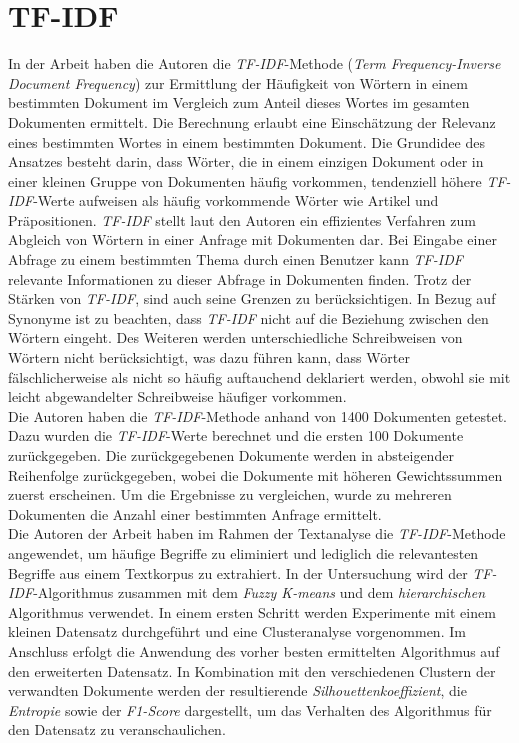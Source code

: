 \section{TF-IDF}
In der Arbeit \cite{ramos2003using} haben die Autoren \citeauthor{ramos2003using} die \emph{TF-IDF}-Methode (\emph{Term Frequency-Inverse Document Frequency}) zur Ermittlung der Häufigkeit von Wörtern in einem bestimmten Dokument im Vergleich zum Anteil dieses Wortes im gesamten Dokumenten ermittelt. Die Berechnung erlaubt eine Einschätzung der Relevanz eines bestimmten Wortes in einem bestimmten Dokument. Die Grundidee des Ansatzes besteht darin, dass Wörter, die in einem einzigen Dokument oder in einer kleinen Gruppe von Dokumenten häufig vorkommen, tendenziell höhere \emph{TF-IDF}-Werte aufweisen als häufig vorkommende Wörter wie Artikel und Präpositionen. \emph{TF-IDF} stellt laut den Autoren ein effizientes Verfahren zum Abgleich von Wörtern in einer Anfrage mit Dokumenten dar. Bei Eingabe einer Abfrage zu einem bestimmten Thema durch einen Benutzer kann \emph{TF-IDF} relevante Informationen zu dieser Abfrage in Dokumenten finden. Trotz der Stärken von \emph{TF-IDF}, sind auch seine Grenzen zu berücksichtigen. In Bezug auf Synonyme ist zu beachten, dass \emph{TF-IDF} nicht auf die Beziehung zwischen den Wörtern eingeht. Des Weiteren werden unterschiedliche Schreibweisen von Wörtern nicht berücksichtigt, was dazu führen kann, dass Wörter fälschlicherweise als nicht so häufig auftauchend deklariert werden, obwohl sie mit leicht abgewandelter Schreibweise häufiger vorkommen.\\
Die Autoren haben die \emph{TF-IDF}-Methode anhand von 1400 Dokumenten getestet. Dazu wurden die \emph{TF-IDF}-Werte berechnet und die ersten 100 Dokumente zurückgegeben. Die zurückgegebenen Dokumente werden in absteigender Reihenfolge zurückgegeben, wobei die Dokumente mit höheren Gewichtssummen zuerst erscheinen. Um die Ergebnisse zu vergleichen, wurde zu mehreren Dokumenten die Anzahl einer bestimmten Anfrage ermittelt.\\

Die Autoren \citeauthor{bafna2016document} der Arbeit \cite{bafna2016document} haben im Rahmen der Textanalyse die \emph{TF-IDF}-Methode angewendet, um häufige Begriffe zu eliminiert und lediglich die relevantesten Begriffe aus einem Textkorpus zu extrahiert. In der Untersuchung wird der \emph{TF-IDF}-Algorithmus zusammen mit dem \emph{Fuzzy K-means} und dem \emph{hierarchischen} Algorithmus verwendet. In einem ersten Schritt werden Experimente mit einem kleinen Datensatz durchgeführt und eine Clusteranalyse vorgenommen. Im Anschluss erfolgt die Anwendung des vorher besten ermittelten Algorithmus auf den erweiterten Datensatz. In Kombination mit den verschiedenen Clustern der verwandten Dokumente werden der resultierende \emph{Silhouettenkoeffizient}, die \emph{Entropie} sowie der \emph{F1-Score} dargestellt, um das Verhalten des Algorithmus für den Datensatz zu veranschaulichen.\\

